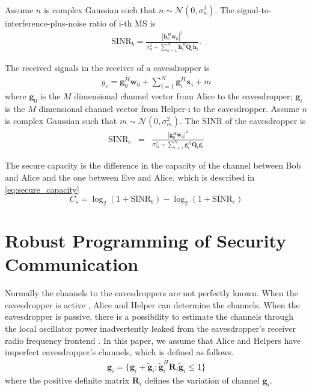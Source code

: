 \documentclass[conference]{IEEEtran}
\begin{document}
Assume $n$ is complex Gaussian such that $n \sim \mathcal{N}(0,\sigma_n^2)$. The signal-to-interference-plus-noise ratio of i-th MS is
\begin{eqnarray}
\mathrm{SINR}_b = \frac{\left| \mathbf{h}_{0}^H\mathbf{w}_{0}\right|^2}{\sigma_n^2 + \sum_{k=1}^{N}\mathbf{h}_{i}^H\mathbf{Q}_{i}\mathbf{h}_i}.
\end{eqnarray}

The received signals in the receiver of a eavesdropper is
\begin{eqnarray}
y_e = \mathbf{g}_0^H\mathbf{w}_0 + \sum_{i = 1}^N\mathbf{g}_i^H\mathbf{x}_i + m
\end{eqnarray}
where $\mathbf{g}_0$ is the $M$ dimensional channel vector from Alice to the eavesdropper; $\mathbf{g}_i$ is the $M$ dimensional channel vector from Helper-i to the eavesdropper.   Assume $n$ is complex Gaussian such that $m \sim \mathcal{N}(0,\sigma_m^2)$.
The SINR of the eavesdropper is
\begin{eqnarray}
\mathrm{SINR}_e &=& \frac{\left| \mathbf{g}_{0}^H\mathbf{w}_{0}\right|^2}{\sigma_m^2 + \sum_{i=1}^{N}\mathbf{g}_{i}^H\mathbf{Q}_{i}\mathbf{g}_i} \label{eq:secure_capacity}
\end{eqnarray}

The secure capacity is the difference in the capacity of the channel between Bob and Alice and the one between Eve and Alice, which is described in \eqref{eq:secure_capacity} 
\begin{equation}
C_s = \log_2\left(1 + \mathrm{SINR}_b\right)-\log_2\left(1 + \mathrm{SINR}_e\right)
\end{equation}


\section{Robust Programming of Security Communication} \label{sec:robust programming}
Normally the channels to the eavesdroppers are not perfectly known. When the eavesdropper is active \cite{gopala2008secrecy}, Alice and Helper can determine the channels. When the eavesdropper is passive, there is a possibility to estimate the channels through the local oscillator power inadvertently leaked from the eavesdropper’s receiver radio frequency frontend \cite{mukherjee2012detecting}. In this paper,  we assume that  Alice and Helpers have imperfect eavesdropper's channels, which is defined as follows. 
\begin{eqnarray}
\mathbf{g}_i = \{\bar{\mathbf{g}}_i + \tilde{\mathbf{g}}_i: \tilde{\mathbf{g}}_i^H \mathbf{R}_i\tilde{\mathbf{g}}_i \leq 1\}
\end{eqnarray}
where the positive definite  matrix $\mathbf{R}_i $ defines the variation of channel $\mathbf{g}_i$. 
\end{document}
